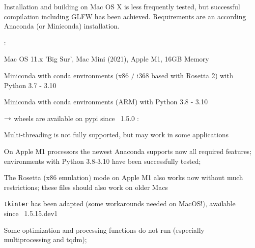 Installation and building on Mac OS X is less frequently tested, but successful compilation including GLFW has been achieved.
Requirements are an according Anaconda (or Miniconda) installation.

\noindent {}:
\bi
  \item Mac OS 11.x 'Big Sur', Mac Mini (2021), Apple M1, 16GB Memory
  \item Miniconda with conda environments (x86 / i368 based with Rosetta 2) with Python 3.7 - 3.10
  \item Miniconda with conda environments (ARM) with Python 3.8 - 3.10
  \item[] $\rightarrow$ wheels are available on pypi since \codeName\ 1.5.0 
\ei
\noindent {}:
\bi
  \item Multi-threading is not fully supported, but may work in some applications
  \item On Apple M1 processors the newest Anaconda supports now all required features; environments with Python 3.8-3.10 have been successfully tested;
  \item The Rosetta (x86 emulation) mode on Apple M1 also works now without much restrictions; these files should also work on older Macs
  \item \texttt{tkinter} has been adapted (some workarounds needed on MacOS!), available since \codeName\ 1.5.15.dev1
  \item Some optimization and processing functions do not run (especially multiprocessing and tqdm); 
\ei

